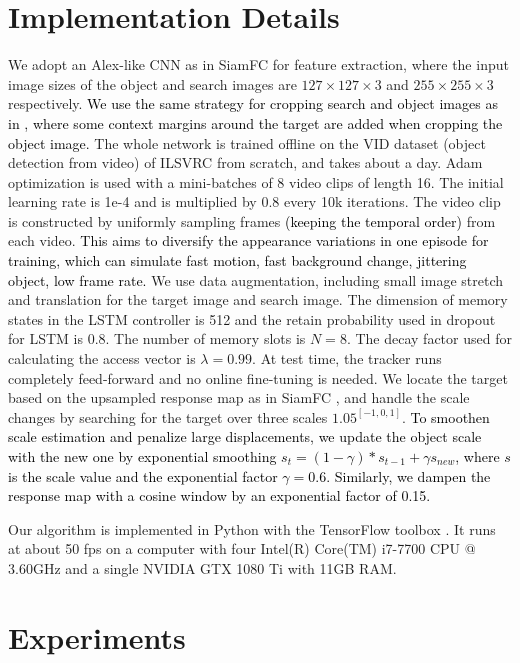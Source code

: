 \documentclass[runningheads]{llncs}
\newcommand{\yty}[1]{\textcolor{black}{#1}}
\newcommand{\ytyy}[1]{\textcolor{black}{#1}}
\newcommand{\abc}[1]{\textcolor{black}{#1}}
\newcommand{\ty}[1]{\textcolor{black}{#1}}
\newcommand{\tyy}[1]{\textcolor{black}{#1}}
\begin{document}
\section{Implementation Details}
We adopt an Alex-like CNN as in SiamFC \cite{Bertinetto2016} for feature extraction, where the input image sizes of the object  and search images are $127\times 127 \times 3$ and $255 \times 255 \times 3$ respectively. \ty{We use the same strategy for cropping search and object images as in \cite{Bertinetto2016}, where some context margins around the target are added when cropping the object image.} The whole network is trained offline on the VID dataset (object detection from video) of ILSVRC \cite{ILSVRC15} from scratch, and takes about a day. %
Adam \cite{kingma2014adam} optimization is used with a mini-batches of 8 video clips of length 16. The initial learning rate is 1e-4 and is multiplied by 0.8 every 10k iterations. The video clip is constructed by %
uniformly sampling frames \abc{(keeping the temporal order)} from each video. \ytyy{This aims to diversify the appearance variations in one episode for training, which can simulate fast motion, fast background change, jittering object, low frame rate.}
We use data augmentation, including small image stretch and translation for the target image and search image. 
The dimension of memory states in the LSTM controller is 512 and the retain probability used in dropout for LSTM is 0.8. The number of memory slots is $N=8$. The decay factor used for calculating the access vector is $\lambda=0.99$.
At test time, the tracker runs completely feed-forward and no online fine-tuning is needed. We locate the target based on the upsampled response map as in SiamFC \cite{Bertinetto2016}, and handle the scale changes by searching for the target over three scales $1.05^{[-1,0,1]}$. \tyy{To smoothen scale estimation and penalize large displacements, we update the object scale with the new one by exponential smoothing $s_{t} = (1-\gamma)*s_{t-1}+\gamma s_{new}$, where $s$ is the scale value and the exponential factor $\gamma = 0.6$. Similarly, we dampen the response map with a cosine window by an exponential factor of 0.15.}

Our algorithm is implemented in Python with the TensorFlow toolbox \cite{abadi2016tensorflow}. It runs at about 50 fps on a computer with four Intel(R) Core(TM) i7-7700 CPU @ 3.60GHz and a single NVIDIA GTX 1080 Ti with 11GB RAM.


\section{Experiments}
\end{document}
